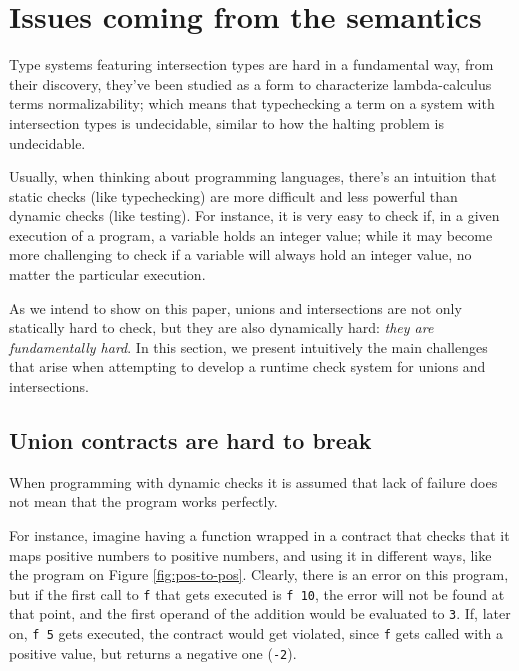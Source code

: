 \documentclass[sigplan,10pt,review,anonymous]{acmart}
\newcommand{\info}[2][1=]{}
\newcommand{\nickel}[1]{\lstinline[language=nickel]{#1}}
\begin{document}
\newpage

\section{Issues coming from the semantics}
\label{sec:issues-sem}
\info{What goes wrong or difficult when trying to implement union and
  intersection literally}

Type systems featuring intersection types are hard in a fundamental way,
from their discovery, they've been studied as a form to characterize
lambda-calculus terms normalizability; which means that typechecking a
term on a system with intersection types is undecidable,
similar to how the halting problem is undecidable.

Usually, when thinking about programming languages, there's an intuition
that static checks (like typechecking) are more difficult and less powerful
than dynamic checks (like testing).
For instance, it is very easy to check if,
in a given execution of a program, a variable holds an integer value; while it
may become more challenging to check if a variable will always hold an integer value,
no matter the particular execution.

As we intend to show on this paper, unions and intersections are not only
statically hard to check, but they are also dynamically hard:
\emph{they are fundamentally hard}.
In this section, we present intuitively the main challenges that arise
when attempting to develop a runtime check system for unions and intersections.

\subsection*{Union contracts are hard to break}

When programming with dynamic checks it is assumed that lack of
failure does not mean that the program works perfectly.

For instance, imagine having a function wrapped in a contract
that checks that it maps positive numbers to positive numbers,
and using it in different ways,
like the program on Figure \ref{fig:pos-to-pos}.
Clearly, there is an error on this program, but if the first call
to \nickel{f} that gets executed is \nickel{f 10}, the error will not
be found at that point, and the first operand of the addition would be
evaluated to \nickel{3}.
If, later on, \nickel{f 5} gets executed, the contract would get violated,
since \nickel{f} gets called with a positive value, but returns a negative
one (\nickel{-2}).
\end{document}
